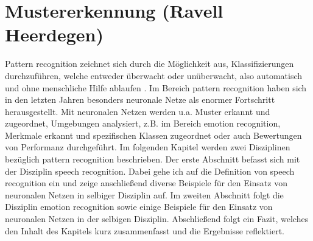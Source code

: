 \section{Mustererkennung (Ravell Heerdegen)}
Pattern recognition zeichnet sich durch die Möglichkeit aus, Klassifizierungen durchzuführen, welche entweder überwacht oder unüberwacht, also automatisch und ohne menschliche Hilfe ablaufen \cite{svmgmm}. Im Bereich pattern recognition haben sich in den letzten Jahren besonders neuronale Netze als enormer Fortschritt herausgestellt. Mit neuronalen Netzen werden u.a. Muster erkannt und zugeordnet, Umgebungen analysiert, z.B. im Bereich emotion recognition, Merkmale erkannt und spezifischen Klassen zugeordnet oder auch Bewertungen von Performanz durchgeführt.\cite{patternrec}
Im folgenden Kapitel werden zwei Disziplinen bezüglich pattern recognition beschrieben. Der erste Abschnitt befasst sich mit der Disziplin speech recognition. Dabei gehe ich auf die Definition von speech recognition ein und zeige anschließend diverse Beispiele für den Einsatz von neuronalen Netzen in selbiger Disziplin auf.
Im zweiten Abschnitt folgt die Disziplin emotion recognition sowie einige Beispiele für den Einsatz von neuronalen Netzen in der selbigen Disziplin. Abschließend folgt ein Fazit, welches den Inhalt des Kapitels kurz zusammenfasst und die Ergebnisse reflektiert.